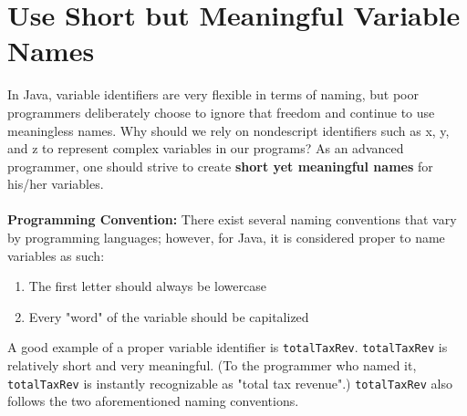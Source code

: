 \documentclass[11pt,oneside]{article}
\newenvironment{articleSection}[1]
{\begin{list}{}
         {\setlength{\leftmargin}{1cm}}
         \item[]
}
{\end{list}}
\begin{document}
\section{Use Short but Meaningful Variable Names}
\begin{articleSection}{0.5cm}
In Java, variable identifiers are very flexible in terms of naming, but poor programmers deliberately choose to ignore that freedom and continue to use meaningless names. Why should we rely on nondescript identifiers such as x, y, and z to represent complex variables in our programs? As an advanced programmer, one should strive to create {\bf short yet meaningful names} for his/her variables.\\
\\
{\bf Programming Convention:} There exist several naming conventions that vary by programming languages; however, for Java, it is considered proper to name variables as such:

\begin{enumerate}
\item{The first letter should always be lowercase}
\item{Every "word" of the variable should be capitalized}
\end{enumerate}


A good example of a proper variable identifier is \lstinline{totalTaxRev}. \lstinline{totalTaxRev} is relatively short and very meaningful. (To the programmer who named it, \lstinline{totalTaxRev} is instantly recognizable as "total tax revenue".) \lstinline{totalTaxRev} also follows the two aforementioned naming conventions. \\
\\

\end{articleSection}
\end{document}
